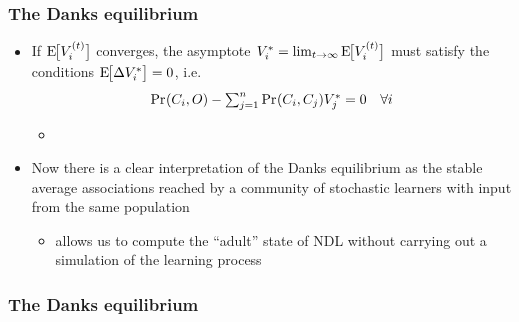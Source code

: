 \documentclass[t]{beamer} %
\begin{document}
\begin{frame}
  \frametitle{The Danks equilibrium}

  \begin{itemize}
  \item If $\mathrm{E}_{}\!\bigl[V_i^{(t)}\bigr]$ converges, the asymptote $V_i^* = \lim_{t\to \infty} \mathrm{E}_{}\!\bigl[V_i^{(t)}\bigr]$ must satisfy the  conditions $\mathrm{E}_{}\!\bigl[\Delta V_i^*\bigr] = 0$, i.e.
    \[
    \mathop{\mathrm{Pr}_{}}(C_i, O) - \textstyle\sum_{j=1}^n \mathop{\mathrm{Pr}_{}}(C_i, C_j) V_j^* = 0 \quad \forall i
    \]
    \citep[p.~113]{Danks:03}
    \begin{itemize}
    \item[]
    \end{itemize}
  \item Now there is a clear interpretation of the Danks equilibrium as the stable average associations reached by a community of stochastic learners with input from the same population
    \begin{itemize}
    \item[\hand] allows us to compute the ``adult'' state of NDL without carrying out a simulation of the learning process
    \end{itemize}
  \end{itemize}
\end{frame}

\begin{frame}[c]
  \frametitle{The Danks equilibrium}

  \centering
\end{frame}
\end{document}
